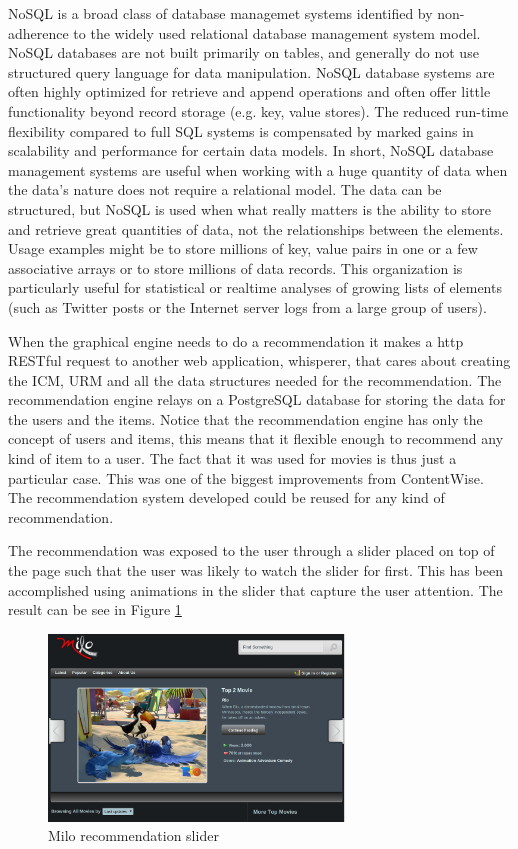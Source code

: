NoSQL is a broad class of database managemet systems identified by non-adherence to the widely used relational database management system model. NoSQL databases are not built primarily on tables, and generally do not use structured query language for data manipulation. NoSQL database systems are often highly optimized for retrieve and append operations and often offer little functionality beyond record storage (e.g. key, value stores). The reduced run-time flexibility compared to full SQL systems is compensated by marked gains in scalability and performance for certain data models. In short, NoSQL database management systems are useful when working with a huge quantity of data when the data's nature does not require a relational model. The data can be structured, but NoSQL is used when what really matters is the ability to store and retrieve great quantities of data, not the relationships between the elements. Usage examples might be to store millions of key, value pairs in one or a few associative arrays or to store millions of data records. This organization is particularly useful for statistical or realtime analyses of growing lists of elements (such as Twitter posts or the Internet server logs from a large group of users).

When the graphical engine needs to do a recommendation it makes a http RESTful request to another web application, whisperer, that cares about creating the \ac{ICM}, \ac{URM} and all the data structures needed for the recommendation. The recommendation engine relays on a PostgreSQL database for storing the data for the users and the items. Notice that the recommendation engine has only the concept of users and items, this means that it flexible enough to recommend any kind of item to a user. The fact that it was used for movies is thus just a particular case. This was one of the biggest improvements from ContentWise. The recommendation system developed could be reused for any kind of recommendation.

The recommendation was exposed to the user through a slider placed on top of the page such that the user was likely to watch the slider for first. This has been accomplished using animations in the slider that capture the user attention. The result can be see in Figure \ref{fig:milo_slider} 

\begin{figure}
  \centering
  \includegraphics[width=0.7\textwidth]{figures/milo_slider.png}
  \caption{Milo recommendation slider}
  \label{fig:milo_slider}
\end{figure}

